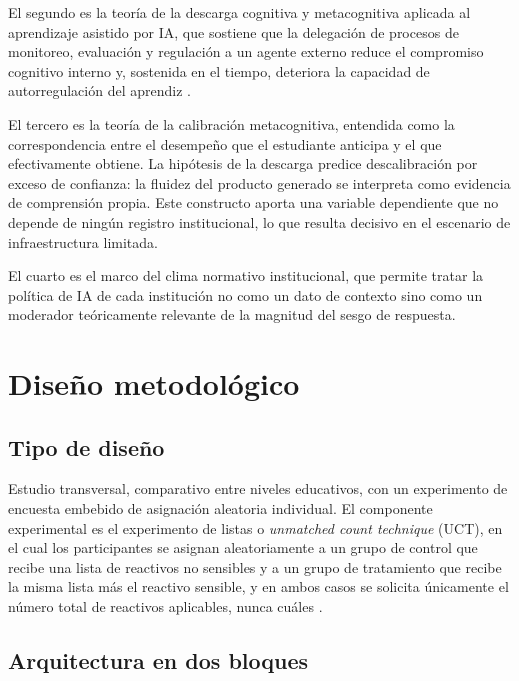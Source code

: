 \documentclass[11pt,a4paper]{article}
\begin{document}
El segundo es la teoría de la descarga cognitiva y metacognitiva aplicada al aprendizaje asistido por IA, que sostiene que la delegación de procesos de monitoreo, evaluación y regulación a un agente externo reduce el compromiso cognitivo interno y, sostenida en el tiempo, deteriora la capacidad de autorregulación del aprendiz \citep{fan2025metacognitive,dizon2026assessing}.

El tercero es la teoría de la calibración metacognitiva, entendida como la correspondencia entre el desempeño que el estudiante anticipa y el que efectivamente obtiene. La hipótesis de la descarga predice descalibración por exceso de confianza: la fluidez del producto generado se interpreta como evidencia de comprensión propia. Este constructo aporta una variable dependiente que no depende de ningún registro institucional, lo que resulta decisivo en el escenario de infraestructura limitada.

El cuarto es el marco del clima normativo institucional, que permite tratar la política de IA de cada institución no como un dato de contexto sino como un moderador teóricamente relevante de la magnitud del sesgo de respuesta.

\section{Diseño metodológico}

\subsection{Tipo de diseño}

Estudio transversal, comparativo entre niveles educativos, con un experimento de encuesta embebido de asignación aleatoria individual. El componente experimental es el experimento de listas o \emph{unmatched count technique} (UCT), en el cual los participantes se asignan aleatoriamente a un grupo de control que recibe una lista de reactivos no sensibles y a un grupo de tratamiento que recibe la misma lista más el reactivo sensible, y en ambos casos se solicita únicamente el número total de reactivos aplicables, nunca cuáles \citep{hinsley2019asking}.

\subsection{Arquitectura en dos bloques}
\label{sec:arquitectura}
\end{document}
